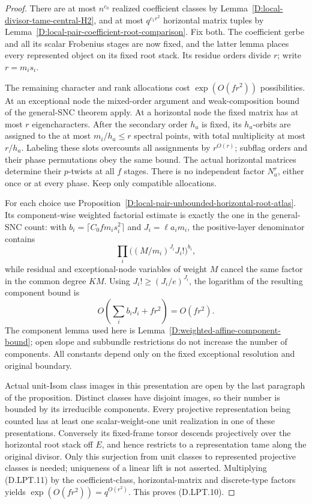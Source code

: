 \begin{proof}
There are at most $n^{c_0}$ realized coefficient classes by
Lemma~\ref{D:local-divisor-tame-central-H2}, and at most
$q^{c_1r^2}$ horizontal matrix tuples by
Lemma~\ref{D:local-pair-coefficient-root-comparison}.
Fix both. The coefficient gerbe and all its scalar Frobenius
stages are now fixed, and the latter lemma places every represented
object on its fixed root stack. Its residue orders divide $r$;
write $r=m_is_i$.

The remaining character and rank allocations cost
$\exp(O(fr^2))$ possibilities. At an exceptional node the
mixed-order argument and weak-composition bound of the general-SNC
theorem apply. At a horizontal node the fixed matrix has at most
$r$ eigencharacters. After the secondary order $h_a$ is fixed,
its $h_a$-orbits are assigned to the at most $m_i/h_a\le r$
spectral points, with total multiplicity at most $r/h_a$.
Labeling these slots overcounts all assignments by $r^{O(r)}$;
subflag orders and their phase permutations obey the same bound.
The actual horizontal matrices determine their $p$-twists at all
$f$ stages. There is no independent factor $N_a^r$, either once
or at every phase. Keep only compatible allocations.

For each choice use Proposition~\ref{D:local-pair-unbounded-horizontal-root-atlas}.
Its component-wise weighted factorial estimate is exactly the
one in the general-SNC count: with
$b_i=\lceil C_0fm_i s_i^2\rceil$ and $J_i=\ell a_i m_i$,
the positive-layer denominator contains
\[
 \prod_i\bigl((M/m_i)^{J_i}J_i!\bigr)^{b_i},
\]
while residual and exceptional-node variables of weight $M$
cancel the same factor in the common degree $KM$.
Using $J_i!\ge(J_i/e)^{J_i}$, the logarithm of the resulting
component bound is
\[
            O\!\left(\sum_i b_iJ_i+fr^2\right)=O(fr^2).
 \tag{D.LPT.11}
\]
The component lemma used here is
Lemma~\ref{D:weighted-affine-component-bound}; open slope and
subbundle restrictions do not increase the number of components.
All constants depend only on the fixed exceptional resolution
and original boundary.

Actual unit-Isom class images in this presentation are open by
the last paragraph of the proposition. Distinct classes have
disjoint images, so their number is bounded by its irreducible
components. Every projective representation being counted has
at least one scalar-weight-one unit realization in one of these
presentations. Conversely its fixed-frame torsor descends
projectively over the horizontal root stack off $E$, and hence
restricts to a representation tame along the original divisor.
Only this surjection from unit classes to represented projective
classes is needed; uniqueness of a linear lift is not asserted.
Multiplying (D.LPT.11) by the coefficient-class, horizontal-matrix
and discrete-type factors yields $\exp(O(fr^2))=q^{O(r^2)}$.
This proves (D.LPT.10).
\end{proof}
